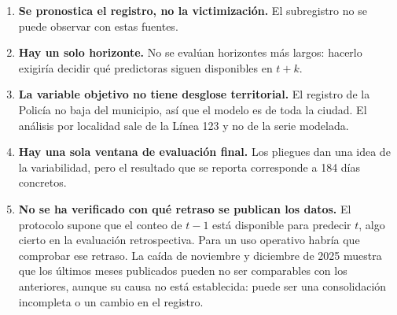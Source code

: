 \begin{enumerate}
  \item \textbf{Se pronostica el registro, no la victimización.} El subregistro no se puede observar con estas fuentes.
  \item \textbf{Hay un solo horizonte.} No se evalúan horizontes más largos: hacerlo exigiría decidir qué predictoras siguen disponibles en $t+k$.
  \item \textbf{La variable objetivo no tiene desglose territorial.} El registro de la Policía no baja del municipio, así que el modelo es de toda la ciudad. El análisis por localidad sale de la Línea 123 y no de la serie modelada.
  \item \textbf{Hay una sola ventana de evaluación final.} Los pliegues dan una idea de la variabilidad, pero el resultado que se reporta corresponde a 184 días concretos.
  \item \textbf{No se ha verificado con qué retraso se publican los datos.} El protocolo supone que el conteo de $t-1$ está disponible para predecir $t$, algo cierto en la evaluación retrospectiva. Para un uso operativo habría que comprobar ese retraso. La caída de noviembre y diciembre de 2025 muestra que los últimos meses publicados pueden no ser comparables con los anteriores, aunque su causa no está establecida: puede ser una consolidación incompleta o un cambio en el registro.
\end{enumerate}
